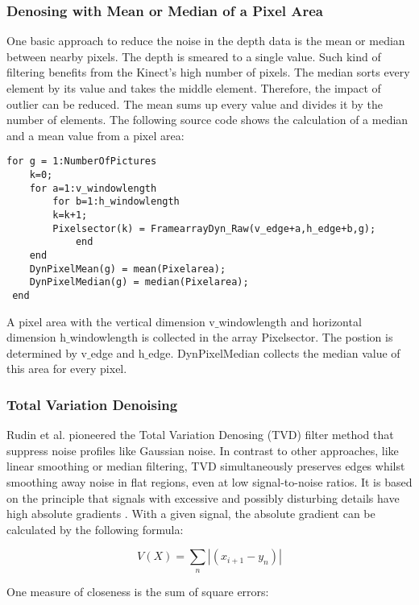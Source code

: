 \subsubsection{Denosing with Mean or Median of a Pixel Area}
One basic approach to reduce the noise in the depth data is the mean or median between nearby pixels. The depth is smeared to a single value. Such kind of filtering benefits from the Kinect's high number of pixels. The median sorts every element by its value and takes the middle element. Therefore, the impact of outlier can be reduced. The mean sums up every value and divides it by the number of elements. The following source code shows the calculation of a median and a mean value from a pixel area:

\begin{lstlisting} 
for g = 1:NumberOfPictures
    k=0;
    for a=1:v_windowlength 
   		for b=1:h_windowlength
   		k=k+1;
   		Pixelsector(k) = FramearrayDyn_Raw(v_edge+a,h_edge+b,g);                
    		end
    end
    DynPixelMean(g) = mean(Pixelarea); 
    DynPixelMedian(g) = median(Pixelarea);
 end
\end{lstlisting}

A pixel area with the vertical dimension v$\_$windowlength and horizontal dimension h$\_$windowlength is collected in the array Pixelsector. The postion is determined by v$\_$edge and h$\_$edge. DynPixelMedian collects the median value of this area for every pixel.
   
\subsubsection{Total Variation Denoising}

Rudin et al. pioneered the Total Variation Denosing (TVD) filter method that suppress noise profiles like Gaussian noise. In contrast to other approaches, like linear smoothing or median filtering, TVD simultaneously preserves edges whilst smoothing away noise in flat regions, even at low signal-to-noise ratios. It is based on the principle that signals with excessive and possibly disturbing details have high absolute gradients \cite{rudin1992nonlinear}. With a given signal, the absolute gradient can be calculated by the following formula:

\begin{equation}
V(X)=\sum_{n} |(x_{i+1} - y_n)|
\end{equation}

One measure of closeness is the sum of square errors:

